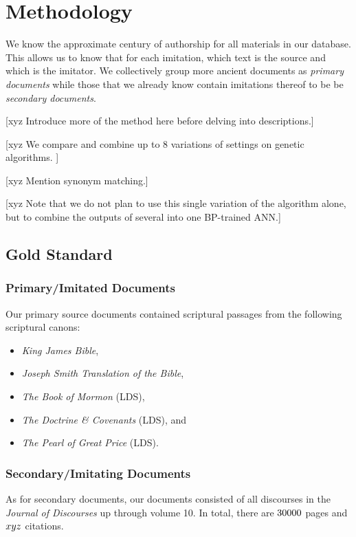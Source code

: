 \section {Methodology}

We know the approximate century of authorship for all materials in our database. This allows us to know that for each imitation, which text is the source and which is the imitator. We collectively group more ancient documents as \textit{primary documents} while those that we already know contain imitations thereof to be be \textit{secondary documents}.

[xyz Introduce more of the method here before delving into descriptions.] 

[xyz We compare and combine up to 8 variations of settings on genetic algorithms. ]

[xyz Mention synonym matching.]

[xyz Note that we do not plan to use this single variation of the algorithm alone, but to combine the outputs of several into one BP-trained ANN.]



\subsection{Gold Standard}
\subsubsection{Primary/Imitated Documents}
Our primary source documents contained scriptural passages from the following scriptural canons:
	\begin{itemize}
		\item \textit{King James Bible},
		\item \textit{Joseph Smith Translation of the Bible},
		\item \textit{The Book of Mormon} (LDS),
		\item \textit{The Doctrine \& Covenants} (LDS), and
		\item \textit{The Pearl of Great Price} (LDS). 
	\end{itemize}

\subsubsection{Secondary/Imitating Documents}
As for secondary documents, our documents consisted of all discourses in the \textit{Journal of Discourses} up through volume 10. In total, there are $30000$ pages and $xyz$ citations.

